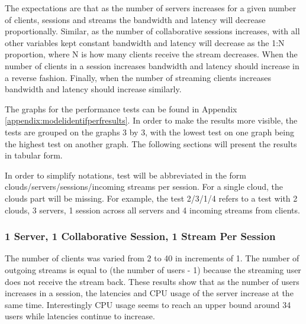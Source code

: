 The expectations are that as the number of servers increases for a given number of clients, sessions and streams the bandwidth and latency will decrease proportionally. Similar, as the number of collaborative sessions increases, with all other variables kept constant bandwidth and latency will decrease as the 1:N proportion, where N is how many clients receive the stream decreases. When the number of clients in a session increases bandwidth and latency should increase in a reverse fashion. Finally, when the number of streaming clients increases bandwidth and latency should increase similarly.

The graphs for the performance tests can be found in Appendix \ref{appendix:modelidentifperfresults}. In order to make the results more visible, the tests are grouped on the graphs 3 by 3, with the lowest test on one graph being the highest test on another graph. The following sections will present the results in tabular form.

In order to simplify notations, test will be abbreviated in the form clouds/servers/sessions/incoming streams per session. For a single cloud, the clouds part will be missing. For example, the test 2/3/1/4 refers to a test with 2 clouds, 3 servers, 1 session across all servers and 4 incoming streams from clients.

\subsubsection{1 Server, 1 Collaborative Session, 1 Stream Per Session}
\label{sec:1serv_1sess_1str}

The number of clients was varied from 2 to 40 in increments of 1. The number of outgoing streams is equal to (the number of users - 1) because the streaming user does not receive the stream back. These results show that as the number of users increases in a session, the latencies and CPU usage of the server increase at the same time. Interestingly CPU usage seems to reach an upper bound around 34 users while latencies continue to increase.

